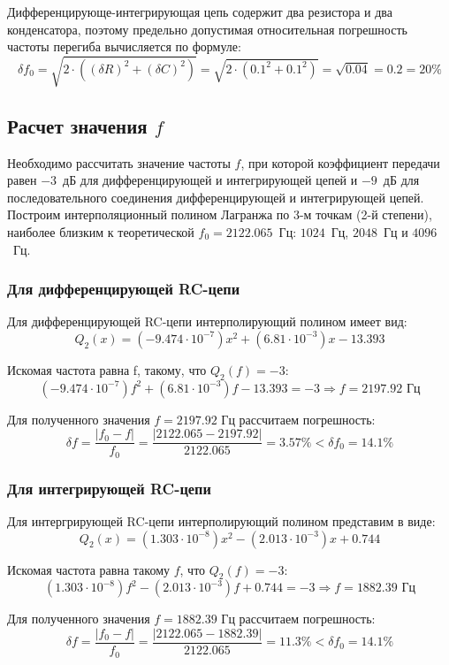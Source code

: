 \documentclass[a4paper,14pt]{extarticle}
\begin{document}
Дифференцирующе-интегрирующая цепь содержит два резистора и два конденсатора, поэтому предельно допустимая относительная погрешность частоты перегиба вычисляется по формуле:
\[
\delta f_0 = \sqrt{2 \cdot ((\delta R)^2 + (\delta C)^2)} = \sqrt{2 \cdot (0.1^2 + 0.1^2)} = \sqrt{0.04} = 0.2 = 20 \%
\]

\subsection{Расчет значения $f$}

Необходимо рассчитать значение частоты $f$, при которой коэффициент передачи равен $-3$~дБ для дифференцирующей и интегрирующей цепей и $-9$~дБ для последовательного соединения дифференцирующей и интегрирующей цепей. Построим интерполяционный полином Лагранжа по 3-м точкам (2-й степени), наиболее близким к теоретической $f_0 = 2122.065$~Гц: $1024$~Гц, $2048$~Гц и $4096$~Гц.

\subsubsection{Для дифференцирующей RC-цепи}

Для дифференцирующей RC-цепи интерполирующий полином имеет вид:
\[
Q_2(x) = (-9.474 \cdot 10^{-7})x^2 + (6.81 \cdot 10^{-3})x - 13.393
\]

Искомая частота равна f, такому, что $Q_2(f) = -3$:
\[
(-9.474 \cdot 10^{-7})f^2 + (6.81 \cdot 10^{-3})f -13.393 = -3 \Rightarrow f = 2197.92 \text{ Гц}
\]

Для полученного значения $f = 2197.92$ Гц рассчитаем погрешность:
\[
\delta f = \frac{|f_0 - f|}{f_0} = \frac{|2122.065 - 2197.92|}{2122.065} = 3.57 \% < \delta f_0 = 14.1\%
\]

\subsubsection{Для интегрирующей RC-цепи}

Для интергрирующей RC-цепи интерполирующий полином представим в виде:
\[
Q_2(x) = (1.303 \cdot 10^{-8})x^2 - (2.013 \cdot 10^{-3})x + 0.744
\]

Искомая частота равна такому $f$, что $Q_2(f) = -3$:
\[
(1.303 \cdot 10^{-8})f^2 - (2.013 \cdot 10^{-3})f + 0.744 = -3 \Rightarrow f = 1882.39 \text{ Гц}
\]

Для полученного значения $f = 1882.39$ Гц рассчитаем погрешность:
\[
\delta f = \frac{|f_0 - f|}{f_0} = \frac{|2122.065 - 1882.39|}{2122.065} = 11.3 \% < \delta f_0 = 14.1\%
\]
\end{document}
